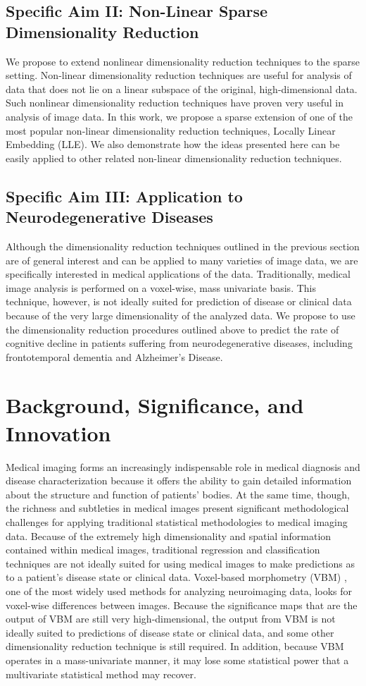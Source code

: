 \documentclass{nih}
\begin{document}
\subsection*{Specific Aim II: Non-Linear Sparse Dimensionality Reduction}
We propose to extend nonlinear dimensionality reduction techniques to the sparse setting.  Non-linear dimensionality reduction techniques are useful for analysis of data that does not lie on a linear subspace of the original, high-dimensional data.  Such nonlinear dimensionality reduction techniques have proven very useful in analysis of image data. In this work, we propose a sparse extension of one of the most popular non-linear dimensionality reduction techniques, Locally Linear Embedding (LLE).  We also demonstrate how the ideas presented here can be easily applied to other related non-linear dimensionality reduction techniques. 
\subsection*{Specific Aim III: Application to Neurodegenerative Diseases}
Although the dimensionality reduction techniques outlined in the previous section are of general interest and can be applied to many varieties of image data, we are specifically interested in medical applications of the data.  Traditionally, medical image analysis is performed on a voxel-wise, mass univariate basis.  This technique, however, is not ideally suited for prediction of disease or clinical data because of the very large dimensionality of the analyzed data.  We propose to use the dimensionality reduction procedures outlined above to predict the rate of cognitive decline in patients suffering from neurodegenerative diseases, including frontotemporal dementia and Alzheimer's Disease. 

\section*{Background, Significance, and Innovation}
Medical imaging forms an increasingly indispensable role in medical diagnosis and disease characterization because it offers the ability to gain detailed information about the structure and function of patients' bodies.  At the same time, though, the richness and subtleties in medical images present significant methodological challenges for applying traditional statistical methodologies to medical imaging data.  Because of the extremely high dimensionality and spatial information contained within medical images, traditional regression and classification techniques are not ideally suited for using medical images to make predictions as to a patient's disease state or clinical data.  Voxel-based morphometry (VBM) \cite{ashburner_voxel-based_2000}, one of the most widely used methods for analyzing neuroimaging data, looks for voxel-wise differences between images.  Because the significance maps that are the output of VBM are still very high-dimensional, the output from VBM is not ideally suited to predictions of disease state or clinical data, and some other dimensionality reduction technique is still required.  In addition, because VBM operates in a mass-univariate manner, it may lose some statistical power that a multivariate statistical method may recover. 
\end{document}
